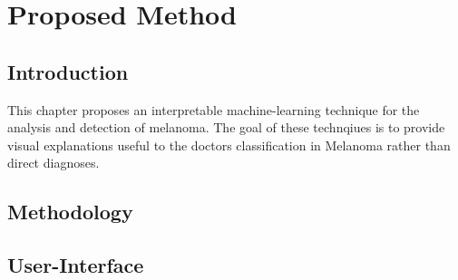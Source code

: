 \chapter{Proposed Method}

\section{Introduction}
This chapter proposes an interpretable machine-learning technique for the analysis and detection of melanoma. The goal of these technqiues is to provide visual explanations useful to the doctors classification in Melanoma rather than direct diagnoses. 


\section{Methodology}


\section{User-Interface}

